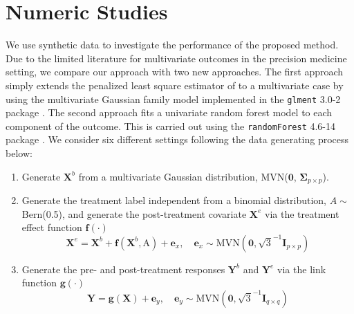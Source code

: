 \documentclass[smallextended]{svjour3}
\begin{document}
\section{Numeric Studies}\label{Sim}

We use synthetic data to investigate the performance of the proposed method. Due to the limited literature for multivariate outcomes in the precision medicine setting, we compare our approach with two new approaches. The first approach simply extends the penalized least square estimator of \citep{qian2011performance} to a multivariate case by using the multivariate Gaussian family model implemented in the \texttt{glment} 3.0-2 package \citep{glmnet}. The second approach fits a univariate random forest model to each component of the outcome. This is carried out using the \texttt{randomForest} 4.6-14 package \citep{liaw2002classification}. We consider six different settings following the data generating process below:
\begin{enumerate}
    \item Generate $\bm{X}^b$ from a multivariate Gaussian distribution, MVN($\bm 0$, $\bm \Sigma_{p \times p}$).
    \item Generate the treatment label independent from a binomial distribution, $A \sim$ Bern(0.5), and generate the post-treatment covariate $\bm X^e$ via the treatment effect function $\bm f(\cdot)$
    \[
        \bm{X}^e = \bm{X}^b + \bm f(\textbf{X}^b, \text{A}) + \textbf{e}_x, \quad \textbf{e}_x \sim \text{MVN}(\bm 0, \sqrt{3}^{-1} \bm I_{p \times p})
    \]
    \item Generate the pre- and post-treatment responses $\bm{Y}^b$ and $\bm{Y}^e$ via the link function $\bm g(\cdot)$
    \[
        \bm{Y} = \bm g(\bm{X}) + \textbf{e}_y, \quad \textbf{e}_y \sim \text{MVN}(\bm 0, \sqrt{3}^{-1} \bm I_{q \times q})
    \]
\end{enumerate}
\end{document}
